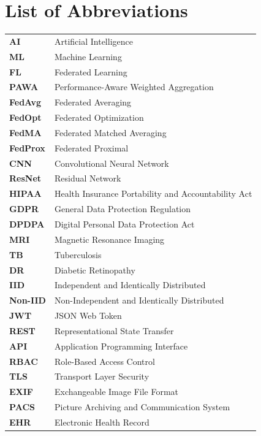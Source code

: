 \chapter*{List of Abbreviations}
\thispagestyle{empty}

\begin{longtable}{ll}
\textbf{AI} & Artificial Intelligence \\
\textbf{ML} & Machine Learning \\
\textbf{FL} & Federated Learning \\
\textbf{PAWA} & Performance-Aware Weighted Aggregation \\
\textbf{FedAvg} & Federated Averaging \\
\textbf{FedOpt} & Federated Optimization \\
\textbf{FedMA} & Federated Matched Averaging \\
\textbf{FedProx} & Federated Proximal \\
\textbf{CNN} & Convolutional Neural Network \\
\textbf{ResNet} & Residual Network \\
\textbf{HIPAA} & Health Insurance Portability and Accountability Act \\
\textbf{GDPR} & General Data Protection Regulation \\
\textbf{DPDPA} & Digital Personal Data Protection Act \\
\textbf{MRI} & Magnetic Resonance Imaging \\
\textbf{TB} & Tuberculosis \\
\textbf{DR} & Diabetic Retinopathy \\
\textbf{IID} & Independent and Identically Distributed \\
\textbf{Non-IID} & Non-Independent and Identically Distributed \\
\textbf{JWT} & JSON Web Token \\
\textbf{REST} & Representational State Transfer \\
\textbf{API} & Application Programming Interface \\
\textbf{RBAC} & Role-Based Access Control \\
\textbf{TLS} & Transport Layer Security \\
\textbf{EXIF} & Exchangeable Image File Format \\
\textbf{PACS} & Picture Archiving and Communication System \\
\textbf{EHR} & Electronic Health Record \\
\end{longtable}
